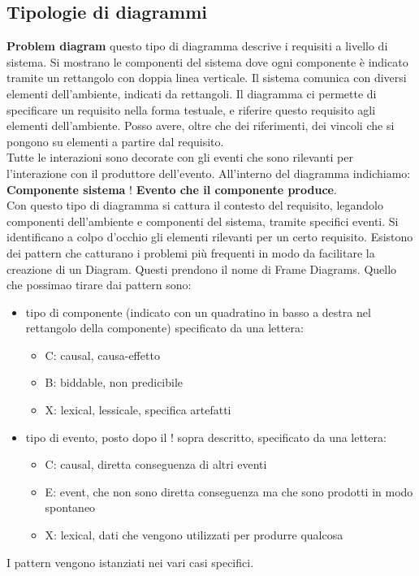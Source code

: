 \subsection{Tipologie di diagrammi}
\textbf{Problem diagram} questo tipo di diagramma descrive i requisiti a livello di sistema. Si mostrano le componenti del sistema dove ogni componente è indicato tramite un rettangolo con doppia linea verticale. Il sistema comunica con diversi elementi dell'ambiente, indicati da rettangoli. Il diagramma ci permette di specificare un requisito nella forma testuale, e riferire questo requisito agli elementi dell'ambiente. Posso avere, oltre che dei riferimenti, dei vincoli che si pongono su elementi a partire dal requisito.\\
Tutte le interazioni sono decorate con gli eventi che sono rilevanti per l'interazione con il produttore dell'evento. All'interno del diagramma indichiamo: \textbf{Componente sistema} \textbf{$!$}  \textbf{Evento che il componente produce}.\\
Con questo tipo di diagramma si cattura il contesto del requisito, legandolo  componenti dell'ambiente e componenti del sistema, tramite specifici eventi. Si identificano a colpo d'occhio gli elementi rilevanti per un certo requisito. Esistono dei pattern che catturano i problemi più frequenti in modo da facilitare la creazione di un Diagram. Questi prendono il nome di Frame Diagrams. Quello che possimao tirare dai pattern sono:
\begin{itemize}
    \item tipo di componente (indicato con un quadratino in basso a destra nel rettangolo della componente) specificato da una lettera:
        \begin{itemize}
            \item C: causal, causa-effetto
            \item B: biddable, non predicibile
            \item X: lexical, lessicale, specifica artefatti
        \end{itemize}
    \item tipo di evento, posto dopo il ! sopra descritto, specificato da una lettera: 
        \begin{itemize}
            \item C: causal, diretta conseguenza di altri eventi
            \item E: event, che non sono diretta conseguenza ma che sono prodotti in modo spontaneo 
            \item X: lexical, dati che vengono utilizzati per produrre qualcosa
        \end{itemize}
\end{itemize}
I pattern vengono istanziati nei vari casi specifici. 

